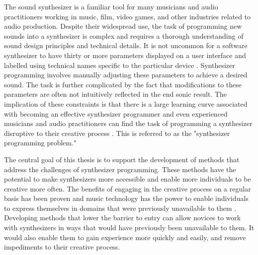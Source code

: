 \label{chapter:introduction}
The sound synthesizer is a familiar tool for many musicians and audio practitioners working in music, film, video games, and other industries related to audio production. Despite their widespread use, the task of programming new sounds into a synthesizer is complex and requires a thorough understanding of sound design principles and technical details. It is not uncommon for a software synthesizer to have thirty or more parameters displayed on a user interface and labelled using technical names specific to the particular device \cite{rasmussen2018evaluating}. Synthesizer programming involves manually adjusting these parameters to achieve a desired sound. The task is further complicated by the fact that modifications to these parameters are often not intuitively reflected in the end sonic result. The implication of these constraints is that there is a large learning curve associated with becoming an effective synthesizer programmer and even experienced musicians and audio practitioners can find the task of programming a synthesizer disruptive to their creative process \cite{krekovic2019insights}. This is referred to as the "synthesizer programming problem."


The central goal of this thesis is to support the development of methods that address the challenges of synthesizer programming. These methods have the potential to make synthesizers more accessible and enable more individuals to be creative more often. The benefits of engaging in the creative process on a regular basis has been proven \cite{conner2018everyday} and music technology has the power to enable individuals to express themselves in domains that were previously unavailable to them \cite{tavana2015democracy}. Developing methods that lower the barrier to entry can allow novices to work with synthesizers in ways that would have previously been unavailable to them. It would also enable them to gain experience more quickly and easily, and remove impediments to their creative process.

